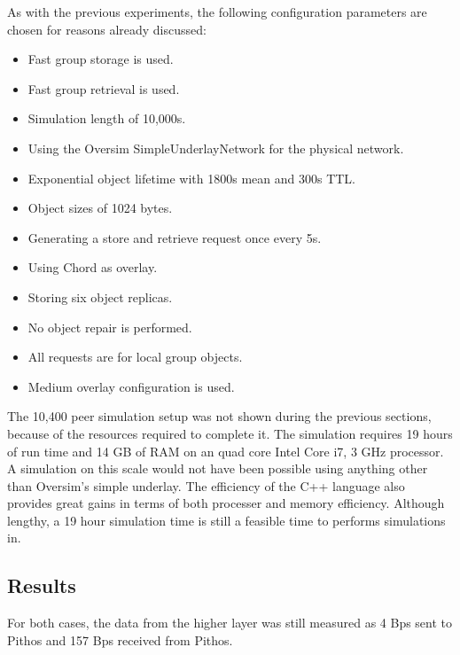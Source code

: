 As with the previous experiments, the following configuration parameters are chosen for reasons already discussed:
%
\begin{itemize}
\item Fast group storage is used.
\item Fast group retrieval is used.
\item Simulation length of 10,000s.
\item Using the Oversim SimpleUnderlayNetwork for the physical network.
\item Exponential object lifetime with 1800s mean and 300s TTL.
\item Object sizes of 1024 bytes.
\item Generating a store and retrieve request once every 5s.
\item Using Chord as overlay.
\item Storing six object replicas.
\item No object repair is performed.
\item All requests are for local group objects.
\item Medium overlay configuration is used.
\end{itemize}


The 10,400 peer simulation setup was not shown during the previous sections, because of the resources required to complete it. The simulation requires 19 hours of run time and 14 GB of RAM on an quad core Intel Core i7, 3 GHz processor. A simulation on this scale would not have been possible using anything other than Oversim's simple underlay. The efficiency of the C++ language also provides great gains in terms of both processer and memory efficiency. Although lengthy, a 19 hour simulation time is still a feasible time to performs simulations in.

\subsection{Results}

For both cases, the data from the higher layer was still measured as 4 Bps sent to Pithos and 157 Bps received from Pithos.

